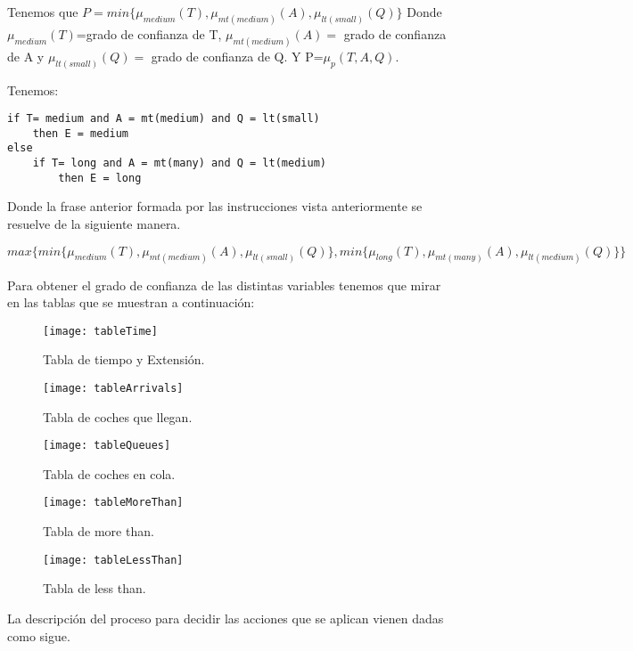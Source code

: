 Tenemos que $P=min\{\mu_{medium}(T),\mu_{mt(medium)}(A),\mu_{lt(small)}(Q)\}$
Donde $\mu_{medium}(T)$=grado de confianza de T, $\mu_{mt(medium)}(A)=$ grado de confianza de A y $\mu_{lt(small)}(Q)=$ grado de confianza de Q.
Y P=$\mu_p(T,A,Q)$.

Tenemos:
\begin{lstlisting}
if T= medium and A = mt(medium) and Q = lt(small)
	then E = medium
else
	if T= long and A = mt(many) and Q = lt(medium)
		then E = long
\end{lstlisting}

Donde la frase anterior formada por las instrucciones vista anteriormente se resuelve de la siguiente manera.

$$max\{min\{\mu_{medium}(T),\mu_{mt(medium)}(A),\mu_{lt(small)}(Q)\},min\{\mu_{long}(T),\mu_{mt(many)}(A),\mu_{lt(medium)}(Q)\}\}$$

Para obtener el grado de confianza de las distintas variables tenemos que mirar en las tablas que se muestran a continuación:

\begin{figure}[H]
	\texttt{[image: tableTime]}
	\centering
	\caption{Tabla de tiempo y Extensión.}

\end{figure}

\begin{figure}[H]
	\texttt{[image: tableArrivals]}
	\centering
	\caption{Tabla de coches que llegan.}

\end{figure}

\begin{figure}[H]
	\texttt{[image: tableQueues]}
	\centering
	\caption{Tabla de coches en cola.}

\end{figure}

\begin{figure}[H]
	\texttt{[image: tableMoreThan]}
	\centering
	\caption{Tabla de more than.}

\end{figure}

\begin{figure}[H]
	\texttt{[image: tableLessThan]}
	\centering
	\caption{Tabla de less than.}

\end{figure}

La descripción del proceso para decidir las acciones que se aplican vienen dadas como sigue.

